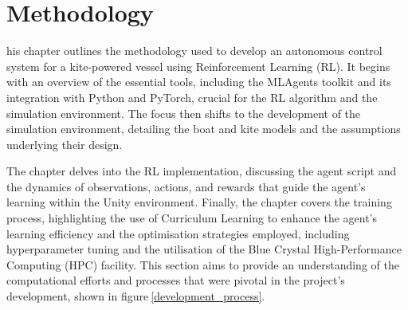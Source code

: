 
%
\let\textcircled=\pgftextcircled\chapter{Methodology}


his chapter outlines the methodology used to develop an autonomous control system for a kite-powered vessel using Reinforcement Learning (RL). It begins with an overview of the essential tools, including the MLAgents toolkit and its integration with Python and PyTorch, crucial for the RL algorithm and the simulation environment. The focus then shifts to the development of the simulation environment, detailing the boat and kite models and the assumptions underlying their design.


The chapter delves into the RL implementation, discussing the agent script and the dynamics of observations, actions, and rewards that guide the agent's learning within the Unity environment. Finally, the chapter covers the training process, highlighting the use of Curriculum Learning to enhance the agent's learning efficiency and the optimisation strategies employed, including hyperparameter tuning and the utilisation of the Blue Crystal High-Performance Computing (HPC) facility. This section aims to provide an understanding of the computational efforts and processes that were pivotal in the project’s development, shown in figure$~$\ref{development_process}. 

